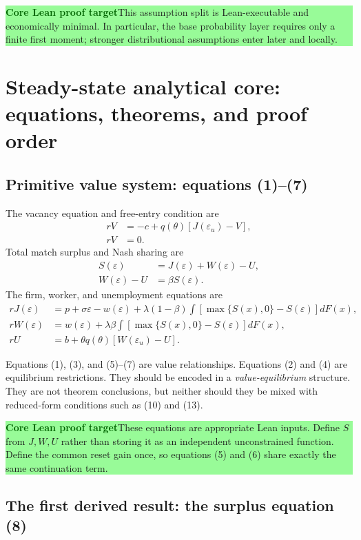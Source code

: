 \documentclass[11pt]{article}
\newcommand{\epsu}{\varepsilon_u}
\newcommand{\core}{\textcolor{darkGreen}{\textbf{Core Lean proof target}}}
\newcommand{\statusbox}[2]{\vspace{2pt}\noindent\colorbox{#1}{\parbox{0.955\linewidth}{\small #2}}\vspace{2pt}}
\begin{document}
\statusbox{paleGreen}{\core\quad This assumption split is Lean-executable and economically minimal. In particular, the base probability layer requires only a finite first moment; stronger distributional assumptions enter later and locally.}

\newpage
\section{Steady-state analytical core: equations, theorems, and proof order}

\subsection{Primitive value system: equations (1)--(7)}

The vacancy equation and free-entry condition are
\begin{align}
 rV&=-c+q(\theta)[J(\epsu)-V], \tag{1}\\
 rV&=0. \tag{2}
\end{align}
Total match surplus and Nash sharing are
\begin{align}
 S(\varepsilon)&=J(\varepsilon)+W(\varepsilon)-U, \tag{3}\\
 W(\varepsilon)-U&=\beta S(\varepsilon). \tag{4}
\end{align}
The firm, worker, and unemployment equations are
\begin{align}
 rJ(\varepsilon)
 &=p+\sigma\varepsilon-w(\varepsilon)
 +\lambda(1-\beta)\int\!\left[\max\{S(x),0\}-S(\varepsilon)\right]dF(x), \tag{5}\\
 rW(\varepsilon)
 &=w(\varepsilon)
 +\lambda\beta\int\!\left[\max\{S(x),0\}-S(\varepsilon)\right]dF(x), \tag{6}\\
 rU&=b+\theta q(\theta)[W(\epsu)-U]. \tag{7}
\end{align}

Equations (1), (3), and (5)--(7) are value relationships. Equations (2) and (4) are equilibrium restrictions. They should be encoded in a \emph{value-equilibrium} structure. They are not theorem conclusions, but neither should they be mixed with reduced-form conditions such as (10) and (13).

\statusbox{paleGreen}{\core\quad These equations are appropriate Lean inputs. Define $S$ from $J,W,U$ rather than storing it as an independent unconstrained function. Define the common reset gain once, so equations (5) and (6) share exactly the same continuation term.}

\subsection{The first derived result: the surplus equation (8)}
\end{document}
